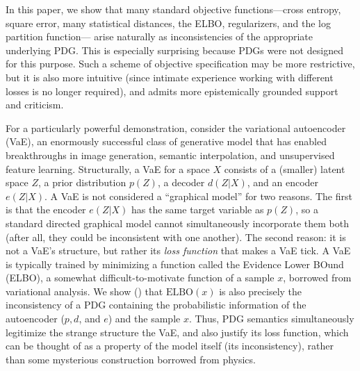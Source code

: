 \documentclass[twoside]{article}
\theoremstyle{plain}
\theoremstyle{definition}
\begin{document}
In this paper, we show that many standard objective functions---cross entropy, square error, many statistical distances, the ELBO, regularizers, and the log partition function---
arise naturally as inconsistencies of the appropriate underlying PDG.
This is especially surprising because PDGs were not designed for this purpose.
Such a scheme of objective specification may be more restrictive, but it is also more intuitive (since intimate experience working with different losses is no longer required), and admits more epistemically grounded support and criticism.



For a particularly powerful demonstration, consider the variational autoencoder (VaE), an enormously successful class of generative model that has enabled breakthroughs in image generation, semantic interpolation, and unsupervised feature learning.
Structurally, a VaE for a space $X$ consists of a (smaller) latent space $Z$, a prior distribution $p(Z)$, a decoder $d(Z | X)$, and an encoder $e(Z| X)$.
A VaE is not considered a ``graphical model'' for two reasons.
The first is that the encoder $e(Z|X)$ has the same target variable as $p(Z)$, so a standard directed graphical model cannot simultaneously incorporate them both (after all, they could be inconsistent with one another).
The second reason: it is not a VaE's structure, but rather its \emph{loss function} that makes a VaE tick. A VaE is typically trained by minimizing a function called the Evidence Lower BOund (ELBO), a somewhat difficult-to-motivate function of a sample $x$, borrowed from variational analysis.
We show () that $\mathrm{ELBO}(x)$ is also precisely the inconsistency of a PDG containing the probabilistic information of the autoencoder ($p, d$, and $e$) and the sample $x$.
Thus, PDG semantics simultaneously legitimize the strange structure the VaE, and also justify its loss function, which can be thought of as a property of the model itself (its inconsistency), rather than some mysterious construction borrowed from physics.
\end{document}
